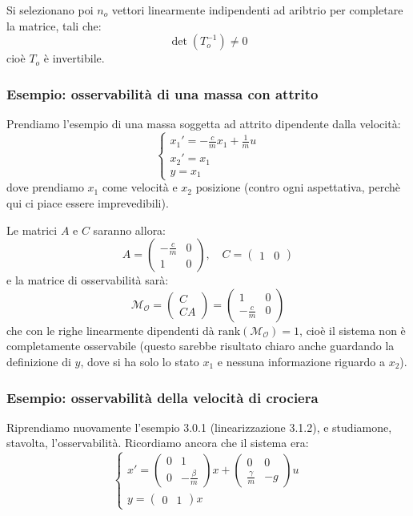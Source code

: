 \documentclass[a4paper,11pt]{article}
\begin{document}
Si selezionano poi $n_o$ vettori linearmente indipendenti ad aribtrio per completare la matrice, tali che:
$$
\det(T_o^{-1}) \neq 0
$$
cioè $T_o$ è invertibile.

\subsubsection{Esempio: osservabilità di una massa con attrito}
Prendiamo l'esempio di una massa soggetta ad attrito dipendente dalla velocità:
\[
	\begin{cases}
		x_1' = -\frac{c}{m} x_1 + \frac{1}{m} u \\ 
		x_2' = x_1 \\
		y = x_1
	\end{cases}
\]
dove prendiamo $x_1$ come velocità e $x_2$ posizione (contro ogni aspettativa, perchè qui ci piace essere imprevedibili).

Le matrici $A$ e $C$ saranno allora:
$$
A = \begin{pmatrix}
	-\frac{c}{m} & 0 \\
	1 & 0
\end{pmatrix}, \quad C = \begin{pmatrix}
	1 & 0
\end{pmatrix}
$$
e la matrice di osservabilità sarà:
$$
\mathcal{M}_\mathcal{O} = \begin{pmatrix}
	C \\ C A
\end{pmatrix} = \begin{pmatrix}
	1 & 0 \\ 
	-\frac{c}{m} & 0
\end{pmatrix}
$$
che con le righe linearmente dipendenti dà $\mathrm{rank}(\mathcal{M}_\mathcal{O}) = 1$, cioè il sistema non è completamente osservabile (questo sarebbe risultato chiaro anche guardando la definizione di $y$, dove si ha solo lo stato $x_1$ e nessuna informazione riguardo a $x_2$).

\subsubsection{Esempio: osservabilità della velocità di crociera}
Riprendiamo nuovamente l'esempio 3.0.1 (linearizzazione 3.1.2), e studiamone, stavolta, l'osservabilità.
Ricordiamo ancora che il sistema era:
\[
	\begin{cases}
		x' = \begin{pmatrix}
			0 & 1 \\
			0 & -\frac{\beta}{m}
		\end{pmatrix} x + \begin{pmatrix}
			0 & 0 \\ 
			\frac{\gamma}{m} & -g
		\end{pmatrix}	u \\ 
		y = \begin{pmatrix}
			0 & 1
		\end{pmatrix} x
	\end{cases}
\]
\end{document}
